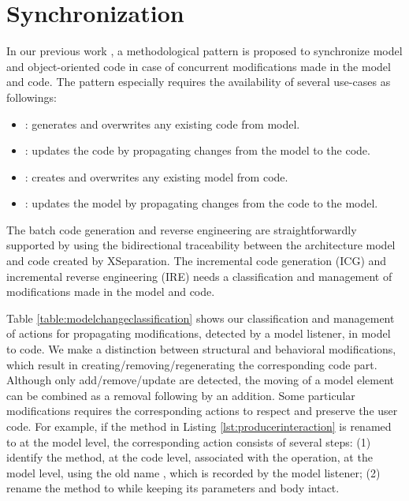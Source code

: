 \section{Synchronization}
\label{sec:collaboration}


In our previous work \cite{foster2016}, a methodological pattern is proposed to synchronize model and object-oriented code in case of concurrent modifications made in the model and code.
The pattern especially requires the availability of several use-cases as followings:
\begin{itemize}[\footnotesize]
	\itemsep0em
	\item {}: generates and overwrites any existing code from model.
	\item {}: updates the code by propagating changes from the model to the code.
	\item {}: creates and overwrites any existing model from code.
	\item {}: updates the model by propagating changes from the code to the model.
\end{itemize}


The batch code generation and reverse engineering are straightforwardly supported by using the bidirectional traceability between the architecture model and code created by XSeparation. The incremental code generation (ICG) and incremental reverse engineering (IRE) needs a classification and management of modifications made in the model and code.

\vskip 0.2cm
\noindent
{}
Table \ref{table:modelchangeclassification} shows our classification and management of actions for propagating modifications, detected by a model listener, in model to code.
We make a distinction between structural and behavioral modifications, which result in creating/removing/regenerating the corresponding code part.
Although only add/remove/update are detected, the moving of a model element can be combined as a removal following by an addition.  
Some particular modifications requires the corresponding actions to respect and preserve the user code.
For example, if the  method in Listing \ref{lst:producerinteraction} is renamed to  at the model level, the corresponding action consists of several steps: (1) identify the method, at the code level, associated with the operation, at the model level, using the old name , which is recorded by the model listener;
(2) rename the method to  while keeping its parameters and body intact. 

